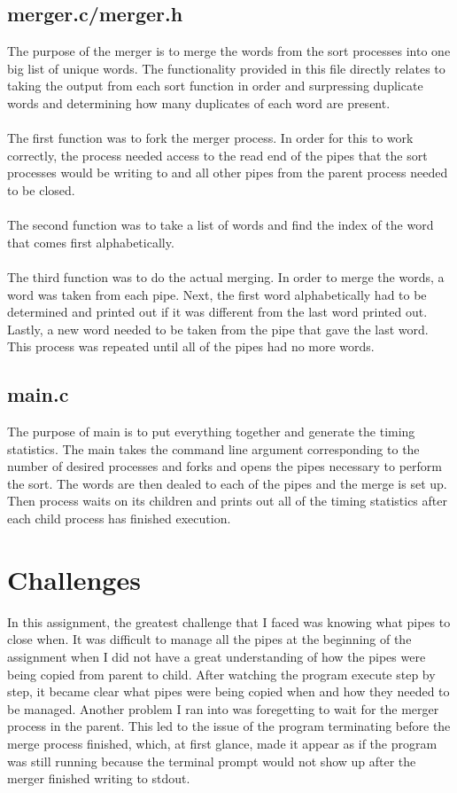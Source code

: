 \documentclass{article}
\begin{document}
\subsection{merger.c/merger.h}
The purpose of the merger is to merge the words from the sort processes into one big list of unique words.  The functionality provided in this file directly relates to taking the output from each sort function in order and surpressing duplicate words and determining how many duplicates of each word are present.  
\\\\The first function was to fork the merger process.  In order for this to work correctly, the process needed access to the read end of the pipes that the sort processes would be writing to and all other pipes from the parent process needed to be closed.
\\\\The second function was to take a list of words and find the index of the word that comes first alphabetically.
\\\\The third function was to do the actual merging.  In order to merge the words, a word was taken from each pipe.  Next, the first word alphabetically had to be determined and printed out if it was different from the last word printed out.  Lastly, a new word needed to be taken from the pipe that gave the last word.  This process was repeated until all of the pipes had no more words.

\subsection{main.c}
The purpose of main is to put everything together and generate the timing statistics.  The main takes the command line argument corresponding to the number of desired processes and forks and opens the pipes necessary to perform the sort.  The words are then dealed to each of the pipes and the merge is set up.  Then process waits on its children and prints out all of the timing statistics after each child process has finished execution.

\section{Challenges}
In this assignment, the greatest challenge that I faced was knowing what pipes to close when.  It was difficult to manage all the pipes at the beginning of the assignment when I did not have a great understanding of how the pipes were being copied from parent to child.  After watching the program execute step by step, it became clear what pipes were being copied when and how they needed to be managed.  Another problem I ran into was foregetting to wait for the merger process in the parent.  This led to the issue of the program terminating before the merge process finished, which, at first glance, made it appear as if the program was still running because the terminal prompt would not show up after the merger finished writing to stdout.
\end{document}
